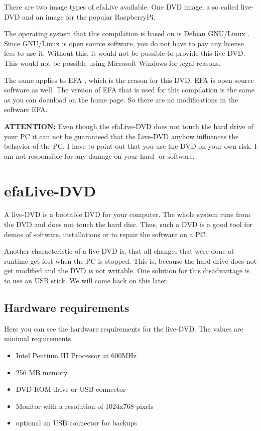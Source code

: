 \documentclass[a4paper,12pt,twoside]{article}
\begin{document}
There are two image types of efaLive available. One DVD image, a so called
live-DVD and an image for the popular RaspberryPi.

The operating system that this compilation is based on is Debian GNU/Linux \cite{DEB1}.
Since GNU/Linux is open source software, you do not have to pay any license
fees to use it. Without this, it would not be possible to provide this
live-DVD. This would not be possible using Microsoft Windows for legal
reasons. 

The same applies to EFA \cite{EFA1}, which is the reason for
this DVD. EFA is open source software as well. The version of EFA that is used
for this compilation is the same as you can doenload on the home page. So there
are no modifications in the software EFA.

\bigskip
\textbf{ATTENTION:} Even though the efaLive-DVD does not touch the hard drive of your PC
it can not be guaranteed that the Live-DVD anyhow influences the
behavior of the PC. I have to point out that you use the DVD on your own
risk. I am not responsible for any damage on your hard- or software.
\bigskip

\section{efaLive-DVD}
\label{sct:efalivecd}
A live-DVD is a bootable DVD for your computer. The whole system runs from
the DVD and does not touch the hard disc. Thus, such a DVD is a good tool
for demos of software, installations or to repair the software on a PC.

Another characteristic of a live-DVD is, that all changes that were done
at runtime get lost when the PC is stopped. This is, because the hard
drive does not get modified and the DVD is not writable. One solution
for this disadvantage is to use an USB stick. We will come back on this
later.

\subsection{Hardware requirements}
\label{sct:live_hardware}
Here you can see the hardware requirements for the live-DVD. The values
are minimal requirements.

\begin{itemize}
    \item Intel Pentium III Processor at 600MHz
    \item 256 MB memory
    \item DVD-ROM drive or USB connector
    \item Monitor with a resolution of 1024x768 pixels
    \item optional an USB connector for backups
\end{itemize}
\end{document}

